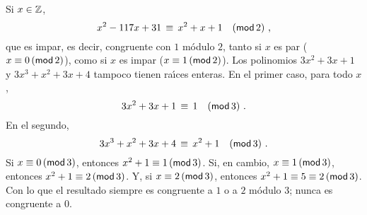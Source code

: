 \begin{ejemCongruencias}\label{ejem:congruencias:motiva:bis}
	Si $x\in\Enteros$,
	\begin{displaymath}
		x^2-117x+31\,\equiv\,x^2+x+1\modulo[2]
		\text{ ,}
	\end{displaymath}
	que es impar, es decir, congruente con $1$ m\'odulo $2$, tanto si
	$x$ es par ($x\equiv 0\tmodulo[2]$), como si $x$ es impar
	($x\equiv 1\tmodulo[2]$). Los polinomios $3x^2+3x+1$ y
	$3x^3+x^2+3x+4$ tampoco tienen ra\'{\i}ces enteras. En el primer
	caso, para todo $x$,
	\begin{displaymath}
		3x^2+3x+1\,\equiv\,1\modulo[3]
		\text{ .}
	\end{displaymath}
	En el segundo,
	\begin{displaymath}
		3x^3+x^2+3x+4\,\equiv\,x^2+1\modulo[3]
		\text{ .}
	\end{displaymath}
	Si $x\equiv 0\tmodulo[3]$, entonces $x^2+1\equiv 1\tmodulo[3]$.
	Si, en cambio, $x\equiv 1\tmodulo[3]$, entonces
	$x^2+1\equiv 2\tmodulo[3]$. Y, si $x\equiv 2\tmodulo[3]$, entonces
	$x^2+1\equiv 5\equiv 2\tmodulo[3]$. Con lo que el resultado siempre
	es congruente a $1$ o a $2$ m\'odulo $3$; nunca es congruente a $0$.
\end{ejemCongruencias}

